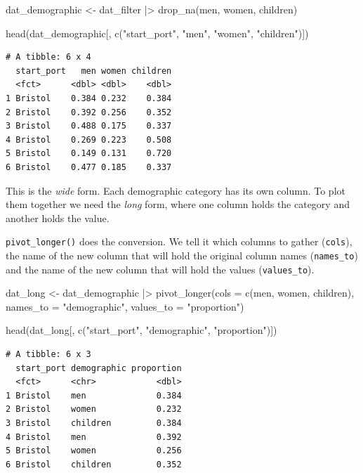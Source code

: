 \documentclass[
  english,
  letterpaper,
]{book}
\newenvironment{Shaded}{\begin{snugshade}}{\end{snugshade}}
\newcommand{\AttributeTok}[1]{\textcolor[rgb]{0.40,0.45,0.13}{#1}}
\newcommand{\FunctionTok}[1]{\textcolor[rgb]{0.28,0.35,0.67}{#1}}
\newcommand{\NormalTok}[1]{\textcolor[rgb]{0.00,0.23,0.31}{#1}}
\newcommand{\OtherTok}[1]{\textcolor[rgb]{0.00,0.23,0.31}{#1}}
\newcommand{\SpecialCharTok}[1]{\textcolor[rgb]{0.37,0.37,0.37}{#1}}
\newcommand{\StringTok}[1]{\textcolor[rgb]{0.13,0.47,0.30}{#1}}
\begin{document}
\begin{Shaded}
\begin{Highlighting}[]
\NormalTok{dat\_demographic }\OtherTok{\textless{}{-}}\NormalTok{ dat\_filter }\SpecialCharTok{|\textgreater{}}
  \FunctionTok{drop\_na}\NormalTok{(men, women, children)}

\FunctionTok{head}\NormalTok{(dat\_demographic[, }\FunctionTok{c}\NormalTok{(}\StringTok{"start\_port"}\NormalTok{, }\StringTok{"men"}\NormalTok{, }\StringTok{"women"}\NormalTok{, }\StringTok{"children"}\NormalTok{)])}
\end{Highlighting}
\end{Shaded}

\begin{verbatim}
# A tibble: 6 x 4
  start_port   men women children
  <fct>      <dbl> <dbl>    <dbl>
1 Bristol    0.384 0.232    0.384
2 Bristol    0.392 0.256    0.352
3 Bristol    0.488 0.175    0.337
4 Bristol    0.269 0.223    0.508
5 Bristol    0.149 0.131    0.720
6 Bristol    0.477 0.185    0.337
\end{verbatim}

This is the \emph{wide} form. Each demographic category has its own
column. To plot them together we need the \emph{long} form, where one
column holds the category and another holds the value.

\texttt{pivot\_longer()} does the conversion. We tell it which columns
to gather (\texttt{cols}), the name of the new column that will hold the
original column names (\texttt{names\_to}) and the name of the new
column that will hold the values (\texttt{values\_to}).

\begin{Shaded}
\begin{Highlighting}[]
\NormalTok{dat\_long }\OtherTok{\textless{}{-}}\NormalTok{ dat\_demographic }\SpecialCharTok{|\textgreater{}}
  \FunctionTok{pivot\_longer}\NormalTok{(}\AttributeTok{cols =} \FunctionTok{c}\NormalTok{(men, women, children),}
               \AttributeTok{names\_to =} \StringTok{"demographic"}\NormalTok{,}
               \AttributeTok{values\_to =} \StringTok{"proportion"}\NormalTok{)}

\FunctionTok{head}\NormalTok{(dat\_long[, }\FunctionTok{c}\NormalTok{(}\StringTok{"start\_port"}\NormalTok{, }\StringTok{"demographic"}\NormalTok{, }\StringTok{"proportion"}\NormalTok{)])}
\end{Highlighting}
\end{Shaded}

\begin{verbatim}
# A tibble: 6 x 3
  start_port demographic proportion
  <fct>      <chr>            <dbl>
1 Bristol    men              0.384
2 Bristol    women            0.232
3 Bristol    children         0.384
4 Bristol    men              0.392
5 Bristol    women            0.256
6 Bristol    children         0.352
\end{verbatim}
\end{document}
